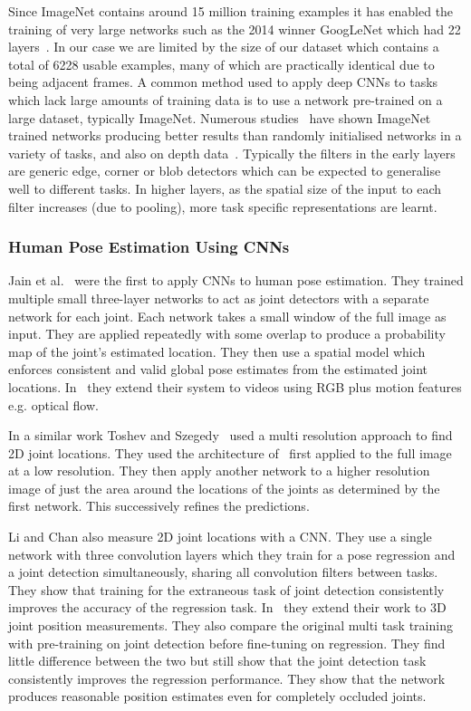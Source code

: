 \documentclass[11pt]{article} %
\begin{document}
Since ImageNet contains around 15 million training examples it has enabled the training of very large networks such as the 2014 winner GoogLeNet which had 22 layers~\cite{Szegedy2014}. In our case we are limited by the size of our dataset which contains a total of 6228 usable examples, many of which are practically identical due to being adjacent frames. A common method used to apply deep CNNs to tasks which lack large amounts of training data is to use a network pre-trained on a large dataset, typically ImageNet. Numerous studies~\cite{Sharif2014,Donahue2014,Oquab2014,Girshick2014,Yosinski2014} have shown ImageNet trained networks producing better results than randomly initialised networks in a variety of tasks, and also on depth data~\cite{Schwarz2015,Alexandre2013}. Typically the filters in the early layers are generic edge, corner or blob detectors which can be expected to generalise well to different tasks. In higher layers, as the spatial size of the input to each filter increases (due to pooling), more task specific representations are learnt. 

\subsubsection{Human Pose Estimation Using CNNs}

\label{sec:HpeCnn} 

Jain et al.~\cite{Jain2013a} were the first to apply CNNs to human pose estimation. They trained multiple small three-layer networks to act as joint detectors with a separate network for each joint. Each network takes a small window of the full image as input. They are applied repeatedly with some overlap to produce a probability map of the joint's estimated location. They then use a spatial model which enforces consistent and valid global pose estimates from the estimated joint locations. In~\cite{Jain2014} they extend their system to videos using RGB plus motion features e.g. optical flow. 

In a similar work Toshev and Szegedy~\cite{Toshev} used a multi resolution approach to find 2D joint locations. They used the architecture of~\cite{Krizhevsky2012} first applied to the full image at a low resolution. They then apply another network to a higher resolution image of just the area around the locations of the joints as determined by the first network. This successively refines the predictions. 

Li and Chan also measure 2D joint locations with a CNN. They use a single network with three convolution layers which they train for a pose regression and a joint detection simultaneously, sharing all convolution filters between tasks. They show that training for the extraneous task of joint detection consistently improves the accuracy of the regression task. In~\cite{Accv2014} they extend their work to 3D joint position measurements. They also compare the original multi task training with pre-training on joint detection before fine-tuning on regression. They find little difference between the two but still show that the joint detection task consistently improves the regression performance. They show that the network produces reasonable position estimates even for completely occluded joints. 
\end{document}
